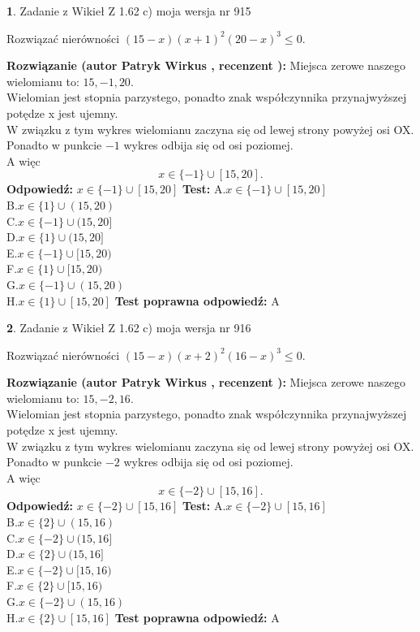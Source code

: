 \documentclass[12pt, a4paper]{article}
\theoremstyle{definition} %
\newtheorem{zad}{}
\newcommand{\zadStart}[1]{\begin{zad}#1\newline}
\newcommand{\zadStop}{\end{zad}}
\newcommand{\rozwStart}[2]{\noindent \textbf{Rozwiązanie (autor #1 , recenzent #2): }\newline}
\newcommand{\rozwStop}{\newline}
\newcommand{\odpStart}{\noindent \textbf{Odpowiedź:}\newline}
\newcommand{\odpStop}{\newline}
\newcommand{\testStart}{\noindent \textbf{Test:}\newline}
\newcommand{\testStop}{\newline}
\newcommand{\kluczStart}{\noindent \textbf{Test poprawna odpowiedź:}\newline}
\newcommand{\kluczStop}{\newline}
\begin{document}
\zadStart{Zadanie z Wikieł Z 1.62 c) moja wersja nr 915}

Rozwiązać nierówności $(15-x)(x+1)^{2}(20-x)^{3}\le0$.
\zadStop
\rozwStart{Patryk Wirkus}{}
Miejsca zerowe naszego wielomianu to: $15, -1, 20$.\\
Wielomian jest stopnia parzystego, ponadto znak współczynnika przy\linebreak najwyższej potędze x jest ujemny.\\ W związku z tym wykres wielomianu zaczyna się od lewej strony powyżej osi OX.\\
Ponadto w punkcie $-1$ wykres odbija się od osi poziomej.\\
A więc $$x \in \{-1\} \cup [15,20].$$
\rozwStop
\odpStart
$x \in \{-1\} \cup [15,20]$
\odpStop
\testStart
A.$x \in \{-1\} \cup [15,20]$\\
B.$x \in \{1\} \cup (15,20)$\\
C.$x \in \{-1\} \cup (15,20]$\\
D.$x \in \{1\} \cup (15,20]$\\
E.$x \in \{-1\} \cup [15,20)$\\
F.$x \in \{1\} \cup [15,20)$\\
G.$x \in \{-1\} \cup (15,20)$\\
H.$x \in \{1\} \cup [15,20]$
\testStop
\kluczStart
A
\kluczStop



\zadStart{Zadanie z Wikieł Z 1.62 c) moja wersja nr 916}

Rozwiązać nierówności $(15-x)(x+2)^{2}(16-x)^{3}\le0$.
\zadStop
\rozwStart{Patryk Wirkus}{}
Miejsca zerowe naszego wielomianu to: $15, -2, 16$.\\
Wielomian jest stopnia parzystego, ponadto znak współczynnika przy\linebreak najwyższej potędze x jest ujemny.\\ W związku z tym wykres wielomianu zaczyna się od lewej strony powyżej osi OX.\\
Ponadto w punkcie $-2$ wykres odbija się od osi poziomej.\\
A więc $$x \in \{-2\} \cup [15,16].$$
\rozwStop
\odpStart
$x \in \{-2\} \cup [15,16]$
\odpStop
\testStart
A.$x \in \{-2\} \cup [15,16]$\\
B.$x \in \{2\} \cup (15,16)$\\
C.$x \in \{-2\} \cup (15,16]$\\
D.$x \in \{2\} \cup (15,16]$\\
E.$x \in \{-2\} \cup [15,16)$\\
F.$x \in \{2\} \cup [15,16)$\\
G.$x \in \{-2\} \cup (15,16)$\\
H.$x \in \{2\} \cup [15,16]$
\testStop
\kluczStart
A
\kluczStop
\end{document}
